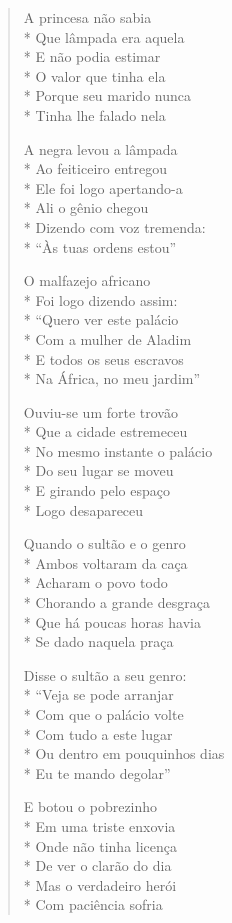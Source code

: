 \begin{verse}
A princesa não sabia\\*
Que lâmpada era aquela\\*
E não podia estimar\\*
O valor que tinha ela\\*
Porque seu marido nunca\\*
Tinha lhe falado nela

A negra levou a lâmpada\\*
Ao feiticeiro entregou\\*
Ele foi logo apertando-a\\*
Ali o gênio chegou\\*
Dizendo com voz tremenda:\\*
``Às tuas ordens estou''

O malfazejo africano\\*
Foi logo dizendo assim:\\*
``Quero ver este palácio\\*
Com a mulher de Aladim\\*
E todos os seus escravos\\*
Na África, no meu jardim''

Ouviu-se um forte trovão\\*
Que a cidade estremeceu\\*
No mesmo instante o palácio\\*
Do seu lugar se moveu\\*
E girando pelo espaço\\*
Logo desapareceu

Quando o sultão e o genro\\*
Ambos voltaram da caça\\*
Acharam o povo todo\\*
Chorando a grande desgraça\\*
Que há poucas horas havia\\*
Se dado naquela praça

Disse o sultão a seu genro:\\*
``Veja se pode arranjar\\*
Com que o palácio volte\\*
Com tudo a este lugar\\*
Ou dentro em pouquinhos dias\\*
Eu te mando degolar''

E botou o pobrezinho\\*
Em uma triste enxovia\\*
Onde não tinha licença\\*
De ver o clarão do dia\\*
Mas o verdadeiro herói\\*
Com paciência sofria


\end{verse}
